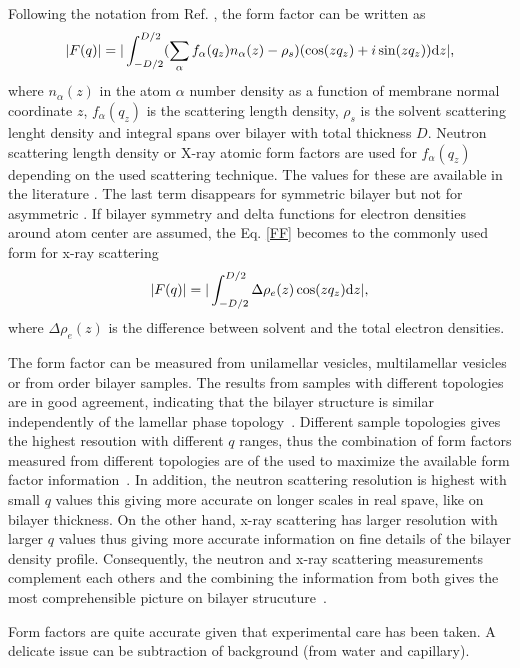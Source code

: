 \documentclass[aps,prl,superscriptaddress,twocolumn]{revtex4}
\begin{document}
Following the notation from Ref. \cite{kucerka10}, the form factor can be written as 
\begin{equation}\label{FF}
|F(q)|=|\int_{-D/2}^{D/2}(\sum_\alpha f_\alpha(q_z)n_\alpha(z) - \rho_s)(\cos(zq_z) + i \sin(zq_z)) {\rm d}z|,
\end{equation}
where $n_\alpha(z)$ in the atom $\alpha$ number density as a function of membrane normal coordinate $z$,
$f_\alpha(q_z)$ is the scattering length density, $\rho_s$ is the solvent scattering lenght density
and integral spans over bilayer with total thickness $D$.
Neutron scattering length density or X-ray atomic form factors are used for $f_\alpha(q_z)$ depending
on the used scattering technique. The values for these are available in the literature \cite{??}.
The last term disappears for symmetric bilayer but not for asymmetric \cite{??}.
If bilayer symmetry and delta functions for electron densities around atom center are assumed, the Eq. \ref{FF}
becomes to the commonly used form for x-ray scattering
\begin{equation}\label{FFsimpl}
|F(q)|=|\int_{-D/2}^{D/2}\Delta \rho_e(z) \cos(zq_z) {\rm d}z|,
\end{equation}
where $\Delta \rho_e(z)$ is the difference between solvent and the total electron densities.

The form factor can be measured from unilamellar vesicles, multilamellar vesicles or from order bilayer samples. 
The results from samples with different topologies are in good agreement, indicating that the bilayer
structure is similar independently of the lamellar phase topology~\cite{??}.
Different sample topologies gives the highest resoution with different $q$ ranges,
thus the combination of form factors measured from different topologies are of the used
to maximize the available form factor information~\cite{??}. In addition, the neutron scattering
resolution is highest with small $q$ values this giving more accurate on longer scales in real spave, like 
on bilayer thickness. On the other hand, x-ray scattering has larger resolution with larger $q$ values
thus giving more accurate information on fine details of the bilayer density profile. Consequently,
the neutron and x-ray scattering measurements complement each others and the combining the information
from both gives the most comprehensible picture on bilayer strucuture~\cite{??}.

Form factors are quite accurate given that experimental care has been taken. A delicate issue 
can be subtraction of background (from water and capillary).  \\
\end{document}
